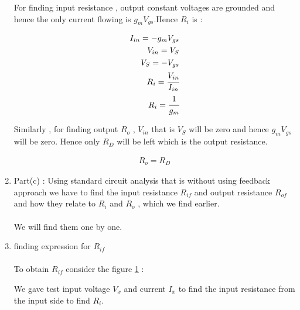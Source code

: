 \begin{enumerate}[label=\arabic*.,ref=\theenumi]
For finding input resistance , output constant voltages are grounded and hence the only current flowing is $g_{m}V_{gs}$.Hence $R_{i}$ is :



\begin{align}
I_{in} = -g_{m}V_{gs}\\
V_{in} = V_{S}\\
V_{S} = -V_{gs}\\
R_{i} = \cfrac{V_{in}}{I_{in}}\\
R_{i} = \cfrac{1}{g_{m}}
\end{align}

Similarly , for finding output $R_{o}$ , $V_{in}$ that is $V_{S}$ will be zero and hence $g_{m}V_{gs}$ will be zero. Hence only $R_{D}$ will 
be left which is the output resistance.

\begin{align}
R_{o}=R_{D}
\end{align}
\item Part(c) : Using standard circuit analysis that is without using feedback approach we have to find the input resistance $R_{if}$ and output resistance $R_{of}$ and how they relate to $R_{i}$ and $R_{o}$ , which we find earlier.\\
\solution \\
We will find them one by one.

\begin{figure}[ht!]
	\begin{center}
		\resizebox{\columnwidth}{!}{}
	\end{center}
	\caption{}
	\label{fig:Small signal for finding input resistance}
\end{figure}

\item finding expression for $R_{if}$\\
\solution\\

To obtain $R_{if}$ consider the figure \ref{fig:Small signal for finding input resistance} :



We gave test input voltage $V_{x}$ and current $I_{x}$ to find the input resistance from the input side to find $R_{i}$.


\end{enumerate}
